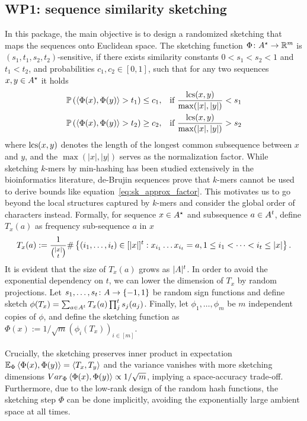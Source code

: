 

\subsection{WP1: sequence similarity sketching}
In this package, the main objective is to design a randomized sketching that maps the sequences onto Euclidean space. 
The sketching function $\Phi\colon A^\star\to \mathbb{R}^m$ is $(s_1,t_1, s_2, t_2)$-sensitive, if there exists similarity constants $0<s_1 < s_2<1$ and $t_1 < t_2$, and probabilities $c_1,c_2\in[0,1]$, such that for any two sequences $x,y\in A^\star$ it holds 
\begin{align}
\label{eq:sk_approx_factor}
\mathbb{P}\left( \left\langle \Phi(x), \Phi(y) \right\rangle > t_1  \right)\le c_1, && \text{if } \frac{\operatorname{\mathrm{lcs}}(x,y)}{\max(|x|,|y|)}< s_1  \\
\mathbb{P}\left( \left\langle \Phi(x), \Phi(y) \right\rangle > t_2  \right)\ge c_2, && \text{if } \frac{\operatorname{\mathrm{lcs}}(x,y)}{\max(|x|,|y|)}>s_2
\end{align}
where $\operatorname{\mathrm{lcs}}(x,y)$ denotes the length of the longest common subsequence between $x$ and $y$, and the $\max(|x|,|y|)$ serves as the normalization factor.
While sketching $k$-mers by min-hashing has been studied extensively in the bioinformatics literature, de-Brujin sequences prove that $k$-mers cannot be used to derive bounds like equation~\eqref{eq:sk_approx_factor}. This motivates us to go beyond the local structures captured by $k$-mers and consider the global order of characters instead. Formally, for sequence $x\in A^\star$ and subsequence $a\in A^t$, define $T_x(a)$ as frequency sub-sequence $a$ in $x$ 
\begin{align}
 T_x(a):=\frac{1}{\binom{|x|}{t}}\# \left\{(i_1,\dots,i_t)\in[|x|]^t: x_{i_1}\dots x_{i_t}=a, 1\le i_1<\dots<i_t\le |x|\right\}.
\end{align}
It is evident that the size of $T_x(a)$ grows as $| A|^t$. In order to avoid the exponential dependency on $t$, we can lower the dimension of $T_x$ by random projections. Let $s_1,\dots, s_t\colon A\to \left\{-1,1\right\}$ be random sign functions and define sketch $\phi(T_x)=\sum_{a\in A^t} T_x(a)\prod_j^t s_j(a_j)$. Finally, let $\phi_1, \dots, \phi_m$ be $m$ independent copies of $\phi$, and define the sketching function as $\Phi(x):=1/\sqrt{m}(\phi_i(T_x))_{i\in[m]}$. 

Crucially, the sketching preserves inner product in expectation $\mathbb{E}_\Phi \left\langle \Phi(x), \Phi(y) \right\rangle = \left\langle T_x, T_y \right\rangle$ and the variance vanishes with more sketching dimensions $Var_\Phi \left\langle \Phi(x), \Phi(y) \right\rangle\propto 1/\sqrt{m}$, implying a space-accuracy trade-off. Furthermore, due to the low-rank design of the random hash functions, the sketching step $\Phi$ can be done implicitly, avoiding the exponentially large ambient space at all times. 

